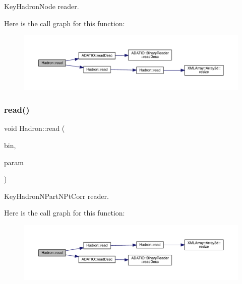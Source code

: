 Key\+Hadron\+Node reader. 

Here is the call graph for this function\+:
\nopagebreak
\begin{figure}[H]
\begin{center}
\leavevmode
\includegraphics[width=350pt]{d1/daf/namespaceHadron_a60758467521910899dec197e7fbc0ab4_cgraph}
\end{center}
\end{figure}
\mbox{\label{namespaceHadron_a51412e3f2ebc9c4d67ed1cc397c4d546}} 
\subsubsection{\texorpdfstring{read()}{read()}\hspace{0.1cm}{\footnotesize\ttfamily [55/94]}}
{\footnotesize\ttfamily void Hadron\+::read (\begin{DoxyParamCaption}\item[{\mbox{\hyperlink{classADATIO_1_1BinaryReader}{Binary\+Reader}} \&}]{bin,  }\item[{\mbox{\hyperlink{structHadron_1_1KeyHadronNPartNPtCorr__t}{Key\+Hadron\+N\+Part\+N\+Pt\+Corr\+\_\+t}} \&}]{param }\end{DoxyParamCaption})}



Key\+Hadron\+N\+Part\+N\+Pt\+Corr reader. 

Here is the call graph for this function\+:
\nopagebreak
\begin{figure}[H]
\begin{center}
\leavevmode
\includegraphics[width=350pt]{d1/daf/namespaceHadron_a51412e3f2ebc9c4d67ed1cc397c4d546_cgraph}
\end{center}
\end{figure}
\mbox{\label{namespaceHadron_ac6d19c651cf61c129b5cf86c15d13ab5}} 
